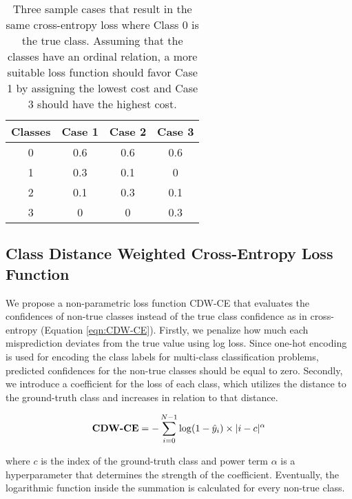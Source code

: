 \documentclass[runningheads]{llncs}
\begin{document}
\begin{table}[]
\vspace{-5mm}
\caption{Three sample cases that result in the same cross-entropy loss where Class 0 is the true class. Assuming that the classes have an ordinal relation, a more suitable loss function should favor Case 1 by assigning the lowest cost and Case 3 should have the highest cost. }
\label{tab:ce_loss_samples}
\begin{adjustbox}{center}
\begin{tabular}{c|ccc}
\textbf{Classes} & \textbf{Case 1} & \textbf{Case 2} & \textbf{Case 3} \\ \hline
0                & 0.6               & 0.6               & 0.6               \\
1                & 0.3               & 0.1               & 0                 \\
2                & 0.1               & 0.3               & 0.1               \\
3                & 0                 & 0                 & 0.3              
\end{tabular}
\end{adjustbox}
\vspace{-5mm}
\end{table}

\subsection{Class Distance Weighted Cross-Entropy Loss Function}

We propose a non-parametric loss function CDW-CE that evaluates the confidences of non-true classes instead of the true class confidence as in cross-entropy (Equation \ref{eqn:CDW-CE}). Firstly, we penalize how much each misprediction deviates from the true value using log loss. Since one-hot encoding is used for encoding the class labels for multi-class classification problems, predicted confidences for the non-true classes should be equal to zero. Secondly, we introduce a coefficient for the loss of each class, which utilizes the distance to the ground-truth class and increases in relation to that distance.

\begin{equation} \label{eqn:CDW-CE}
    \textrm{\textbf{CDW-CE}} = -\sum_{i=0}^{N-1} {\log(1-\hat{y}_i) \times |i-c|^{\alpha}}
\end{equation}

\noindent where $c$ is the index of the ground-truth class and power term $\alpha$ is a hyperparameter that determines the strength of the coefficient. Eventually, the logarithmic function inside the summation is calculated for every non-true class.
\end{document}
